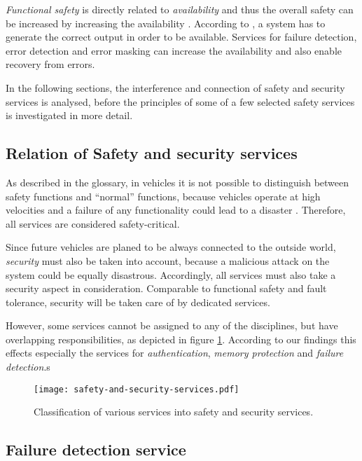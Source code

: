 \emph{Functional safety} is directly related to \emph{availability} and thus the overall safety can be increased by increasing the availability \cite{turek2011}. According to \cite{turek2011}, a system has to generate the correct output in order to be available. Services for failure detection, error detection and error masking can increase the availability and also enable recovery from errors.

In the following sections, the interference and connection of safety and security services is analysed, before the principles of some of a few selected safety services is investigated in more detail.

\subsection{Relation of Safety and security services}

As described in the glossary, in vehicles it is not possible to distinguish between safety functions and ``normal'' functions, because vehicles operate at high velocities and a failure of any functionality could lead to a disaster \cite{iso26262:course2}. Therefore, all services are considered safety-critical.

Since future vehicles are planed to be always connected to the outside world, \emph{security} must also be taken into account, because a malicious attack on the system could be equally disastrous. Accordingly, all services must also take a security aspect in consideration. Comparable to functional safety and fault tolerance, security will be taken care of by dedicated services.

However, some services cannot be assigned to any of the disciplines, but have overlapping responsibilities, as depicted in figure \ref{fig:safety-and-security-services}. According to our findings this effects especially the services for \emph{authentication}, \emph{memory protection} and \emph{failure detection}.s

\begin{figure}[!htbp]
\centering
\texttt{[image: safety-and-security-services.pdf]}
\caption{Classification of various services into safety and security services.}
\label{fig:safety-and-security-services}
\end{figure}




\subsection{Failure detection service}


